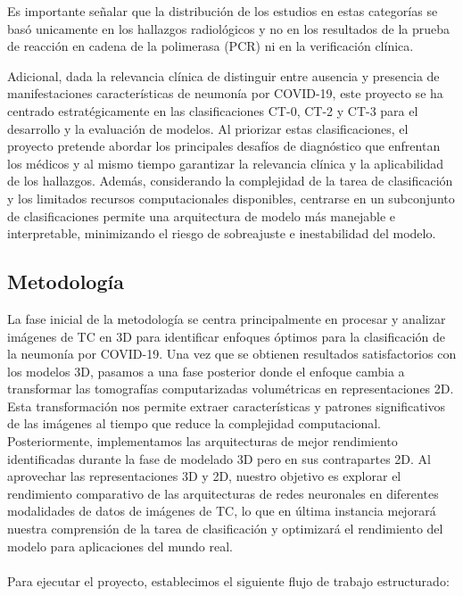 \documentclass[10pt, oneside, a4paper]{article}
\begin{document}
	Es importante señalar que la distribución de los estudios en estas categorías se basó unicamente en los hallazgos radiológicos y no en los resultados de la prueba de reacción en cadena de la polimerasa (PCR) ni en la verificación clínica.
	
	Adicional, dada la relevancia clínica de distinguir entre ausencia y presencia de manifestaciones características de neumonía por COVID-19, este proyecto se ha centrado estratégicamente en las clasificaciones CT-0, CT-2 y CT-3 para el desarrollo y la evaluación de modelos. Al priorizar estas clasificaciones, el proyecto pretende abordar los principales desafíos de diagnóstico que enfrentan los médicos y al mismo tiempo garantizar la relevancia clínica y la aplicabilidad de los hallazgos. Además, considerando la complejidad de la tarea de clasificación y los limitados recursos computacionales disponibles, centrarse en un subconjunto de clasificaciones permite una arquitectura de modelo más manejable e interpretable, minimizando el riesgo de sobreajuste e inestabilidad del modelo.
	
	\subsection{Metodología} \label{metodologia_1}
	
	La fase inicial de la metodología se centra principalmente en procesar y analizar imágenes de TC en 3D para identificar enfoques óptimos para la clasificación de la neumonía por COVID-19. Una vez que se obtienen resultados satisfactorios con los modelos 3D, pasamos a una fase posterior donde el enfoque cambia a transformar las tomografías computarizadas volumétricas en representaciones 2D. Esta transformación nos permite extraer características y patrones significativos de las imágenes al tiempo que reduce la complejidad computacional. Posteriormente, implementamos las arquitecturas de mejor rendimiento identificadas durante la fase de modelado 3D pero en sus contrapartes 2D. Al aprovechar las representaciones 3D y 2D, nuestro objetivo es explorar el rendimiento comparativo de las arquitecturas de redes neuronales en diferentes modalidades de datos de imágenes de TC, lo que en última instancia mejorará nuestra comprensión de la tarea de clasificación y optimizará el rendimiento del modelo para aplicaciones del mundo real. \\ \\
	Para ejecutar el proyecto, establecimos el siguiente flujo de trabajo estructurado:
	
\end{document}
